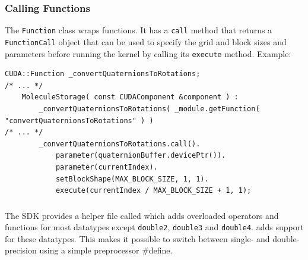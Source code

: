 \subsubsection{Calling \cuda{} Functions}
The \lstinline!Function! class wraps \cuda{} functions. It has a \lstinline!call! method that returns a \lstinline!FunctionCall! object that can be used to specify the grid and block sizes and parameters before running the \cuda{} kernel by calling its \lstinline!execute! method.
Example:
\begin{lstlisting}[label=cudafunctionhelpers,caption=CUDA helper classes for Function Calls]
	CUDA::Function _convertQuaternionsToRotations;
/* ... */		
	MoleculeStorage( const CUDAComponent &component ) :
		_convertQuaternionsToRotations( _module.getFunction( "convertQuaternionsToRotations" ) )
/* ... */
		_convertQuaternionsToRotations.call().
			parameter(quaternionBuffer.devicePtr()).
			parameter(currentIndex).
			setBlockShape(MAX_BLOCK_SIZE, 1, 1).
			execute(currentIndex / MAX_BLOCK_SIZE + 1, 1);
\end{lstlisting}

\subsubsection{}
The \cuda{} SDK provides a helper file called  which adds overloaded operators and functions for most \cuda{} datatypes except \lstinline!double2!, \lstinline!double3! and \lstinline!double4!.
 adds support for these datatypes.
This makes it possible to switch between single- and double-precision using a simple preprocessor \#define.

